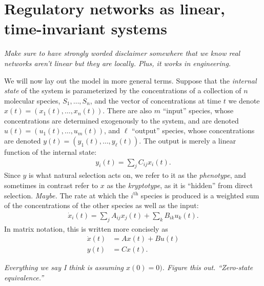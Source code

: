 \documentclass[11 pt]{article}
\newcommand{\plr}[1]{{\color{blue}\it #1}}
\newcommand{\ddt}{\dot}
\begin{document}
\section{Regulatory networks as linear, time-invariant systems}

\plr{Make sure to have strongly worded disclaimer somewhere
that we know real networks aren't linear
but they are locally.
Plus, it works in engineering.}


We will now lay out the model in more general terms.
Suppose that the \emph{internal state} of the system
is parameterized by the concentrations of a collection of $n$ molecular species,
$S_1, \ldots, S_n$,
and the vector of concentrations at time $t$ we denote $x(t)=(x_1(t),\ldots,x_n(t))$.
There are also $m$ ``input'' species, whose concentrations are determined
exogenously to the system,
and are denoted $u(t) = (u_1(t),\ldots,u_m(t))$,
and $\ell$ ``output'' species, whose concentrations are denoted
$y(t) = (y_1(t),\ldots,y_\ell(t))$.
The output is merely a linear function of the internal state:
\begin{align*}
    y_i(t) = \sum_j C_{ij} x_i(t).
\end{align*}
Since $y$ is what natural selection acts on, we refer to it as the \emph{phenotype},
and sometimes in contrast refer to $x$ as the \emph{kryptotype},
as it is ``hidden'' from direct selection.
\plr{Maybe.}
The rate at which the $i^\text{th}$ species is produced
is a weighted sum of the concentrations of the other species
as well as the input:
\begin{align*}
    \ddt x_i(t) = \sum_j A_{ij} x_j(t) + \sum_k B_{ik} u_k(t) .
\end{align*}
In matrix notation, this is written more concisely as
\begin{align} \label{eqn:lti_system}
    \ddt x(t) &= A x(t) + B u(t) \\
    y(t) &= C x(t) .
\end{align}

\plr{Everything we say I think is assuming $x(0)=0)$.  
Figure this out. ``Zero-state equivalence.''}
\end{document}
